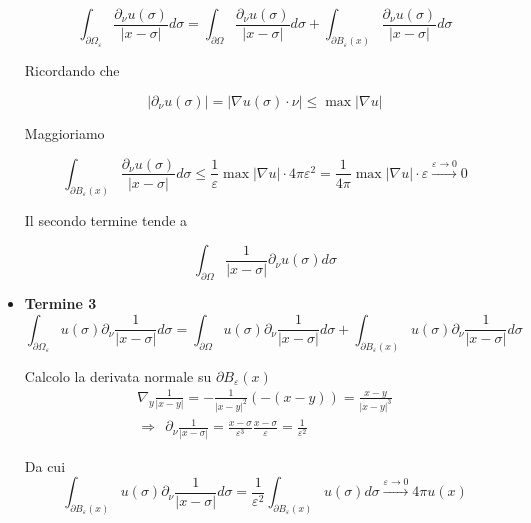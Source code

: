 \documentclass[10pt,a4paper,twoside,openright]{book}
\begin{document}
\begin{dimostrazione}
\begin{itemize}
		      \begin{equation*}
		      	\int _{\partial \Omega _{\varepsilon }}\frac{\partial _{\nu } u(\sigma)}{| x-\sigma | } d\sigma =\int _{\partial \Omega }\frac{\partial _{\nu } u(\sigma)}{| x-\sigma | } d\sigma +\int _{\partial B_{\varepsilon }(x)}\frac{\partial _{\nu } u(\sigma)}{| x-\sigma | } d\sigma 
		      \end{equation*}
		      
		      Ricordando che 
		      
		      \begin{equation*}
		      	| \partial _{\nu } u(\sigma)| =| \nabla u(\sigma) \cdotp \nu | \leqslant \max| \nabla u| 
		      \end{equation*}
		      
		      Maggioriamo
		      
		      \begin{equation*}
		      	\int _{\partial B_{\varepsilon }(x)}\frac{\partial _{\nu } u(\sigma)}{| x-\sigma | } d\sigma \leqslant \frac{1}{\varepsilon }\max| \nabla u| \cdotp 4\pi \varepsilon ^{2} =\frac{1}{4\pi }\max| \nabla u| \cdotp \varepsilon \xrightarrow{\varepsilon \rightarrow 0} 0
		      \end{equation*}
		      
		      Il secondo termine tende a
		      
		      \begin{equation*}
		      	\int _{\partial \Omega }\frac{1}{| x-\sigma | } \partial _{\nu } u(\sigma) d\sigma 
		      \end{equation*}
		\item \textbf{Termine 3}\begin{equation*}
		      \int _{\partial \Omega _{\varepsilon }} u(\sigma) \partial _{\nu }\frac{1}{| x-\sigma | } d\sigma =\int _{\partial \Omega } u(\sigma) \partial _{\nu }\frac{1}{| x-\sigma | } d\sigma +\int _{\partial B_{\varepsilon }(x)} u(\sigma) \partial _{\nu }\frac{1}{| x-\sigma | } d\sigma 
		\end{equation*}
		
		Calcolo la derivata normale su $\displaystyle \partial B_{\varepsilon }(x)$\begin{gather*}
		\nabla _{y}\frac{1}{| x-y| } =-\frac{1}{| x-y| ^{2}}(-(x-y)) =\frac{x-y}{| x-y| ^{3}}\\
		\Rightarrow \ \ \partial _{\nu }\frac{1}{| x-\sigma | } =\frac{x-\sigma }{\varepsilon ^{3}}\frac{x-\sigma }{\varepsilon } =\frac{1}{\varepsilon ^{2}}
		\end{gather*}
		
		Da cui\begin{equation*}
		\int _{\partial B_{\varepsilon }(x)} u(\sigma) \partial _{\nu }\frac{1}{| x-\sigma | } d\sigma =\frac{1}{\varepsilon ^{2}}\int _{\partial B_{\varepsilon }(x)} u(\sigma) d\sigma \xrightarrow{\varepsilon \rightarrow 0} 4\pi u(x)
		\end{equation*}
	\end{itemize}
\end{dimostrazione}
\end{document}
